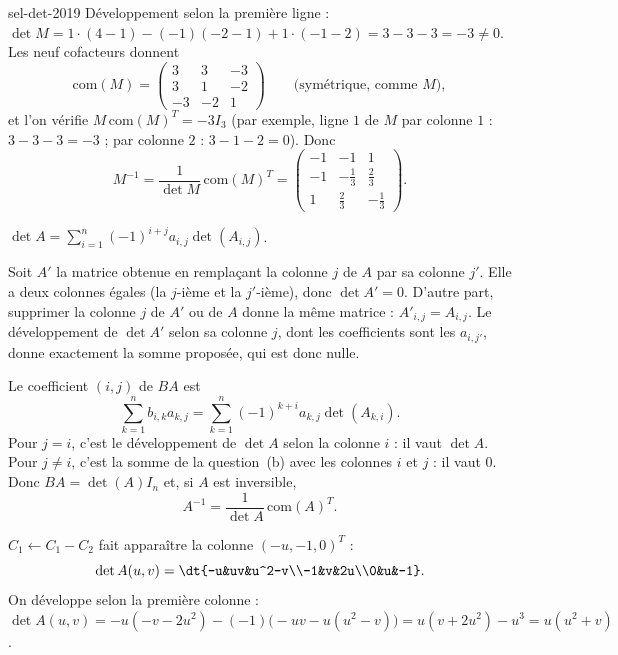 \begin{corrige}{sel-det-2019}
 Développement selon la première ligne : $\det M=1\cdot(4-1)-(-1)(-2-1)+1\cdot(-1-2)=3-3-3=-3\neq0$. Les neuf cofacteurs donnent
\[\mathrm{com}(M)=\begin{pmatrix}3&3&-3\\3&1&-2\\-3&-2&1\end{pmatrix}\qquad\text{(symétrique, comme $M$)},\]
et l'on vérifie $M\,\mathrm{com}(M)^T=-3I_3$ (par exemple, ligne $1$ de $M$ par colonne $1$ : $3-3-3=-3$ ; par colonne $2$ : $3-1-2=0$). Donc
\[M^{-1}=\frac1{\det M}\,\mathrm{com}(M)^T=\begin{pmatrix}-1&-1&1\\-1&-\frac13&\frac23\\1&\frac23&-\frac13\end{pmatrix}.\]

 $\det A=\sum_{i=1}^n(-1)^{i+j}a_{i,j}\det(A_{i,j})$.

 Soit $A'$ la matrice obtenue en remplaçant la colonne $j$ de $A$ par sa colonne $j'$. Elle a deux colonnes égales (la $j$-ième et la $j'$-ième), donc $\det A'=0$. D'autre part, supprimer la colonne $j$ de $A'$ ou de $A$ donne la même matrice : $A'_{i,j}=A_{i,j}$. Le développement de $\det A'$ selon sa colonne $j$, dont les coefficients sont les $a_{i,j'}$, donne exactement la somme proposée, qui est donc nulle.

 Le coefficient $(i,j)$ de $BA$ est
\[\sum_{k=1}^nb_{i,k}a_{k,j}=\sum_{k=1}^n(-1)^{k+i}a_{k,j}\det(A_{k,i}).\]
Pour $j=i$, c'est le développement de $\det A$ selon la colonne $i$ : il vaut $\det A$. Pour $j\neq i$, c'est la somme de la question~(b) avec les colonnes $i$ et $j$ : il vaut $0$. Donc $BA=\det(A)I_n$ et, si $A$ est inversible,
\[A^{-1}=\frac1{\det A}\,\mathrm{com}(A)^T.\]

 $C_1\leftarrow C_1-C_2$ fait apparaître la colonne $(-u,-1,0)^T$ :
\[\det A(u,v)=\dt{-u&uv&u^2-v\\-1&v&2u\\0&u&-1}.\]
On développe selon la première colonne : $\det A(u,v)=-u(-v-2u^2)-(-1)\big(-uv-u(u^2-v)\big)=u(v+2u^2)-u^3=u(u^2+v)$.


\end{corrige}
